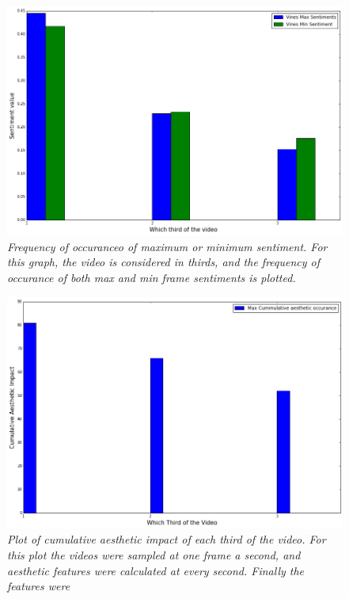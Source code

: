 \begin{figure}[!htb]
\centering
\includegraphics[width=\columnwidth]{plots/SentimentsThirds}
\caption{\textsl{ Frequency of occuranceo of maximum or minimum sentiment. For this graph, the video is considered in thirds, and the frequency of occurance of both max and min frame sentiments is plotted. }}
\label{fig:Senti_Thirds}
\end{figure} 


\begin{figure}[!htb]
\centering
\includegraphics[width=\columnwidth]{plots/cumulativeAestheticImpact}
\caption{\textsl{ Plot of cumulative aesthetic impact of each third of the video. For this plot the videos were sampled at one frame a second, and aesthetic features were calculated at every second. Finally the features were  }}
\label{fig:Senti_Thirds}
\end{figure} 
